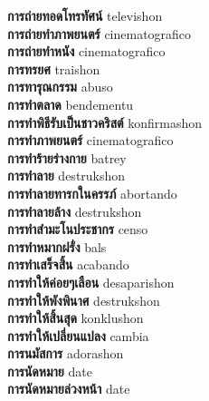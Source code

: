\textbf{ การถ่ายทอดโทรทัศน์  } televishon \\
\textbf{ การถ่ายทำภาพยนตร์  } cinematografico \\
\textbf{ การถ่ายทำหนัง  } cinematografico \\
\textbf{ การทรยศ  } traishon \\
\textbf{ การทารุณกรรม  } abuso \\
\textbf{ การทำตลาด  } bendementu \\
\textbf{ การทำพิธีรับเป็นชาวคริสต์  } konfirmashon \\
\textbf{ การทำภาพยนตร์  } cinematografico \\
\textbf{ การทำร้ายร่างกาย  } batrey \\
\textbf{ การทำลาย  } destrukshon \\
\textbf{ การทำลายทารกในครรภ์  } abortando \\
\textbf{ การทำลายล้าง  } destrukshon \\
\textbf{ การทำสำมะโนประชากร  } censo \\
\textbf{ การทำหมากฝรั่ง  } bals \\
\textbf{ การทำเสร็จสิ้น  } acabando \\
\textbf{ การทำให้ค่อยๆเลือน  } desaparishon \\
\textbf{ การทำให้พังพินาศ  } destrukshon \\
\textbf{ การทำให้สิ้นสุด  } konklushon \\
\textbf{ การทำให้เปลี่ยนแปลง  } cambia \\
\textbf{ การนมัสการ  } adorashon \\
\textbf{ การนัดหมาย  } date \\
\textbf{ การนัดหมายล่วงหน้า  } date \\
